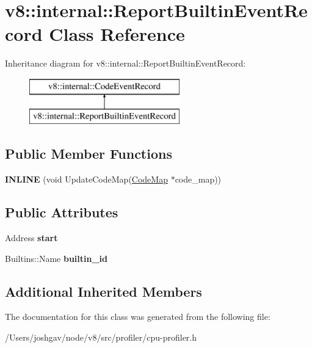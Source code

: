 \hypertarget{classv8_1_1internal_1_1_report_builtin_event_record}{}\section{v8\+:\+:internal\+:\+:Report\+Builtin\+Event\+Record Class Reference}
\label{classv8_1_1internal_1_1_report_builtin_event_record}
Inheritance diagram for v8\+:\+:internal\+:\+:Report\+Builtin\+Event\+Record\+:\begin{figure}[H]
\begin{center}
\leavevmode
\includegraphics[height=2.000000cm]{classv8_1_1internal_1_1_report_builtin_event_record}
\end{center}
\end{figure}
\subsection*{Public Member Functions}
\begin{DoxyCompactItemize}
\item 
{\bfseries I\+N\+L\+I\+NE} (void Update\+Code\+Map(\hyperlink{classv8_1_1internal_1_1_code_map}{Code\+Map} $\ast$code\+\_\+map))\hypertarget{classv8_1_1internal_1_1_report_builtin_event_record_a426b35c985d678fdf1abeb7bc677bed3}{}\label{classv8_1_1internal_1_1_report_builtin_event_record_a426b35c985d678fdf1abeb7bc677bed3}

\end{DoxyCompactItemize}
\subsection*{Public Attributes}
\begin{DoxyCompactItemize}
\item 
Address {\bfseries start}\hypertarget{classv8_1_1internal_1_1_report_builtin_event_record_ac7ebe4048f88a1e0a433213494754555}{}\label{classv8_1_1internal_1_1_report_builtin_event_record_ac7ebe4048f88a1e0a433213494754555}

\item 
Builtins\+::\+Name {\bfseries builtin\+\_\+id}\hypertarget{classv8_1_1internal_1_1_report_builtin_event_record_ab06c795d55d0154ee34481488999df31}{}\label{classv8_1_1internal_1_1_report_builtin_event_record_ab06c795d55d0154ee34481488999df31}

\end{DoxyCompactItemize}
\subsection*{Additional Inherited Members}


The documentation for this class was generated from the following file\+:\begin{DoxyCompactItemize}
\item 
/\+Users/joshgav/node/v8/src/profiler/cpu-\/profiler.\+h\end{DoxyCompactItemize}

